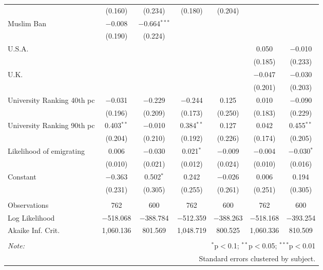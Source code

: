\begin{sidewaystable}[!htbp]
\begin{tabular}{@{\extracolsep{5pt}}lcccccc}
  & (0.160) & (0.234) & (0.180) & (0.204) &  &  \\ 
  Muslim Ban & $-$0.008 & $-$0.664$^{***}$ &  &  &  &  \\ 
  & (0.190) & (0.224) &  &  &  &  \\ 
  U.S.A. &  &  &  &  & 0.050 & $-$0.010 \\ 
  &  &  &  &  & (0.185) & (0.233) \\ 
  U.K. &  &  &  &  & $-$0.047 & $-$0.030 \\ 
  &  &  &  &  & (0.201) & (0.203) \\ 
  University Ranking 40th pc & $-$0.031 & $-$0.229 & $-$0.244 & 0.125 & 0.010 & $-$0.090 \\ 
  & (0.196) & (0.209) & (0.173) & (0.250) & (0.183) & (0.229) \\ 
  University Ranking 90th pc & 0.403$^{**}$ & $-$0.010 & 0.384$^{**}$ & 0.127 & 0.042 & 0.455$^{**}$ \\ 
  & (0.204) & (0.210) & (0.192) & (0.226) & (0.174) & (0.205) \\ 
  Likelihood of emigrating & 0.006 & $-$0.030 & 0.021$^{*}$ & $-$0.009 & $-$0.004 & $-$0.030$^{*}$ \\ 
  & (0.010) & (0.021) & (0.012) & (0.024) & (0.010) & (0.016) \\ 
  Constant & $-$0.363 & 0.502$^{*}$ & 0.242 & $-$0.026 & 0.006 & 0.194 \\ 
  & (0.231) & (0.305) & (0.255) & (0.261) & (0.251) & (0.305) \\ 
 \hline \\[-1.8ex] 
Observations & 762 & 600 & 762 & 600 & 762 & 600 \\ 
Log Likelihood & $-$518.068 & $-$388.784 & $-$512.359 & $-$388.263 & $-$518.168 & $-$393.254 \\ 
Akaike Inf. Crit. & 1,060.136 & 801.569 & 1,048.719 & 800.525 & 1,060.336 & 810.509 \\ 
\hline 
\hline \\[-1.8ex] 
\textit{Note:}  & \multicolumn{6}{r}{$^{*}$p$<$0.1; $^{**}$p$<$0.05; $^{***}$p$<$0.01} \\ 
 & \multicolumn{6}{r}{Standard errors clustered by subject.} \\ 
\end{tabular} 
\end{sidewaystable} 
